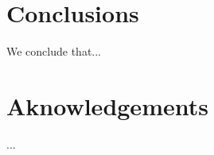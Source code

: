 \documentclass[11pt,a4paper]{article}
\begin{document}
\tableofcontents
\clearpage







\section{Conclusions}
\label{sec:Conclusions}
We conclude that...

\section*{Aknowledgements}
...

\newpage

\appendix






\end{document}
